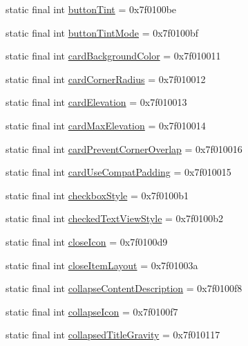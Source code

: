 \begin{CompactItemize}
static final int \hyperlink{classandroid_1_1support_1_1v4_1_1_r_1_1attr_52c5252b61da74bac638e9f63458fc16}{buttonTint} = 0x7f0100be
\item 
static final int \hyperlink{classandroid_1_1support_1_1v4_1_1_r_1_1attr_3b69bdbe501c005ba957ea050bf30f56}{buttonTintMode} = 0x7f0100bf
\item 
static final int \hyperlink{classandroid_1_1support_1_1v4_1_1_r_1_1attr_c58901e4bf9f6d04fbca50f613b2ba49}{cardBackgroundColor} = 0x7f010011
\item 
static final int \hyperlink{classandroid_1_1support_1_1v4_1_1_r_1_1attr_6da47afa46df6a4f673cbe0681783d7a}{cardCornerRadius} = 0x7f010012
\item 
static final int \hyperlink{classandroid_1_1support_1_1v4_1_1_r_1_1attr_73740d3d5c8225b693120a59eba435be}{cardElevation} = 0x7f010013
\item 
static final int \hyperlink{classandroid_1_1support_1_1v4_1_1_r_1_1attr_0419af13f5fd8dbc1c846e1667b52a91}{cardMaxElevation} = 0x7f010014
\item 
static final int \hyperlink{classandroid_1_1support_1_1v4_1_1_r_1_1attr_056ac83099f50b4a87340751155d3020}{cardPreventCornerOverlap} = 0x7f010016
\item 
static final int \hyperlink{classandroid_1_1support_1_1v4_1_1_r_1_1attr_33e2ba021284f6062c76a9722d1a22b3}{cardUseCompatPadding} = 0x7f010015
\item 
static final int \hyperlink{classandroid_1_1support_1_1v4_1_1_r_1_1attr_10d1658f5e3d7e6fe48718949b234e53}{checkboxStyle} = 0x7f0100b1
\item 
static final int \hyperlink{classandroid_1_1support_1_1v4_1_1_r_1_1attr_ba2f4458e204001b44d5e81cc756e7d1}{checkedTextViewStyle} = 0x7f0100b2
\item 
static final int \hyperlink{classandroid_1_1support_1_1v4_1_1_r_1_1attr_476adbeb90fbab818e9dbd94c01ef292}{closeIcon} = 0x7f0100d9
\item 
static final int \hyperlink{classandroid_1_1support_1_1v4_1_1_r_1_1attr_5072858eac0994000618279226f3bfcc}{closeItemLayout} = 0x7f01003a
\item 
static final int \hyperlink{classandroid_1_1support_1_1v4_1_1_r_1_1attr_1a12539605c158306b97b48f25f27a3f}{collapseContentDescription} = 0x7f0100f8
\item 
static final int \hyperlink{classandroid_1_1support_1_1v4_1_1_r_1_1attr_b153dc9c13272453f558afab1a23b483}{collapseIcon} = 0x7f0100f7
\item 
static final int \hyperlink{classandroid_1_1support_1_1v4_1_1_r_1_1attr_a9bb8eca8c589c14b1cd3d702b6d9a61}{collapsedTitleGravity} = 0x7f010117

\end{CompactItemize}
